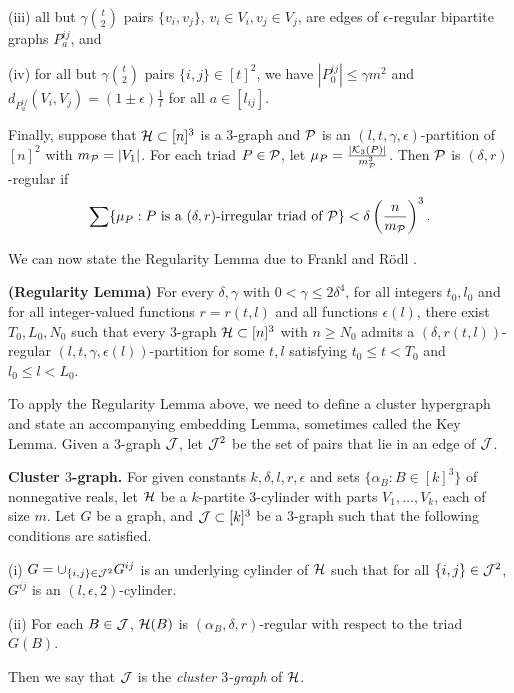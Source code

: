 \documentclass[11pt]{article}
\begin{document}
(iii) all but $\gamma{t \choose 2}$ pairs $\{v_i, v_j\}$, $v_i \in V_i, v_j \in V_j$,
are edges of $\epsilon$-regular bipartite graphs $P_{a}^{ij}$, and

(iv) for all but $\gamma{t \choose 2}$ pairs $\{i,j\} \in [t]^2$,
we have $|P_0^{ij}|\le \gamma m^2$ and $d_{ P_{a}^{ij} }(V_i, V_j)=(1\pm \epsilon)\frac{1}{l}$
for all $a \in [l_{ij}]$.

Finally, suppose that ${\cal H} \subset [n]^3$ is a $3$-graph and ${\cal P}$
is an $(l, t, \gamma, \epsilon)$-partition of $[n]^2$ with
$m_{{\cal P}}=|V_1|$. For each triad $P \in {\cal P}$, let
$\mu_P=\frac{|{\cal K}_3(P)|}{m_{{\cal P}}^3}$. Then ${\cal P}$ is $(\delta,
r)$-regular if
$$\sum\{\mu_P: \hbox{$P$ is a $(\delta, r)$-irregular triad of ${\cal P}$}\} <\delta\left(\frac{n}{m_{{\cal P}}}\right)^3.$$

We can now state the Regularity Lemma due to Frankl and R\"odl
\cite{FR}.

\begin{theorem} {\bf (Regularity Lemma)} \label{rl}
For every $\delta, \gamma$ with $0<\gamma\le 2\delta^4$, for all
integers $t_0, l_0$ and for all integer-valued functions $r=r(t, l)$
and all functions $\epsilon(l)$, there exist $T_0, L_0, N_0$ such
that every $3$-graph ${\cal H} \subset [n]^3$ with $n\ge N_0$ admits a
$(\delta, r(t,l))$-regular $(l, t, \gamma, \epsilon(l))$-partition
for some $t,l$ satisfying $t_0 \le t<T_0$ and $l_0\le l<L_0$.
\end{theorem}

To apply the Regularity Lemma above, we need to define a cluster
hypergraph and state an accompanying embedding Lemma,  sometimes
called the Key Lemma.  Given a $3$-graph ${\cal J}$, let ${\cal J}^2$ be the
set of pairs that lie in an edge of ${\cal J}$.

{\bf Cluster $3$-graph.} For given constants $k, \delta, l, r,
\epsilon$ and sets  $\{\alpha_B: B \in [k]^3\}$ of nonnegative
reals, let ${\cal H}$ be a $k$-partite 3-cylinder with parts $V_1,
\ldots, V_k$, each of size $m$.  Let $G$ be a graph, and ${\cal J}
\subset [k]^3$ be a $3$-graph such that the following conditions are
satisfied.

(i) $G=\cup_{\{i,j\} \in {\cal J}^2} G^{ij}$ is an underlying cylinder of
${\cal H}$ such that for all $\{i,j\} \in {\cal J}^2$, $G^{ij}$ is an $(l,
\epsilon, 2)$-cylinder.

(ii) For each $B \in {\cal J}$, ${\cal H}(B)$ is $(\alpha_B, \delta, r)$-regular with respect to the triad $G(B)$.

Then we say that ${\cal J}$ is the {\it cluster $3$-graph} of ${\cal H}$.
\end{document}

